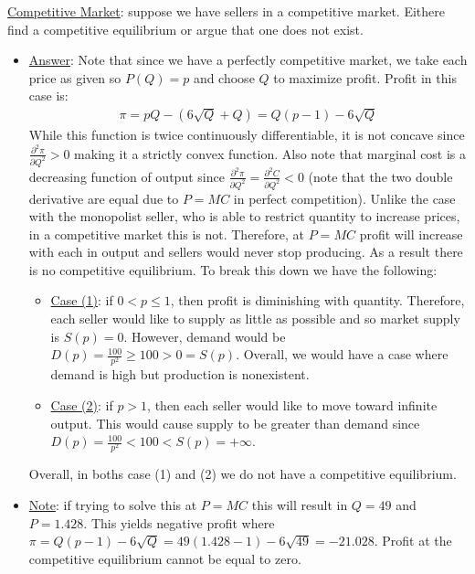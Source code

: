 \documentclass{article}
\begin{document}
  \par
  \underline{Competitive Market}: suppose we have sellers in a competitive market. Eithere find a competitive equilibrium or argue that one does not exist.
  \begin{itemize}
    \item  \underline{Answer}: Note that since we have a perfectly competitive market, we take each price as given so $P(Q) = p$ and choose $Q$ to maximize profit. Profit in this case is:
    \begin{gather*}
      \pi = pQ - (6\sqrt{Q} + Q) = Q(p-1) - 6\sqrt{Q}
    \end{gather*}
    While this function is twice continuously differentiable, it is not concave since $\tfrac{\partial^{2}\pi}{\partial Q^{2}} > 0$ making it a strictly convex function. Also note that marginal cost is a decreasing function of output since $\tfrac{\partial^{2}\pi}{\partial Q^{2}} = \tfrac{\partial^{2}C}{\partial Q^{2}} < 0$ (note that the two double derivative are equal due to $P=MC$ in perfect competition). Unlike the case with the monopolist seller, who is able to restrict quantity to increase prices, in a competitive market this is not. Therefore, at $P = MC$ profit will increase with each in output and sellers would never stop producing. As a result there is no competitive equilibrium. To break this down we have the following:
    \begin{itemize}
      \item  \underline{Case (1)}: if $0 < p \leq 1$, then profit is diminishing with quantity. Therefore, each seller would like to supply as little as possible and so market supply is $S(p) = 0$. However, demand would be $D(p) = \tfrac{100}{p^{2}} \geq 100 > 0 = S(p)$. Overall, we would have a case where demand is high but production is nonexistent.
      \item  \underline{Case (2)}: if $p > 1$, then each seller would like to move toward infinite output. This would cause supply to be greater than demand since $D(p) = \tfrac{100}{p^{2}} < 100 < S(p) = +\infty$.
    \end{itemize}
    Overall, in boths case (1) and (2) we do not have a competitive equilibrium.
    \item  \underline{Note}: if trying to solve this at $P=MC$ this will result in $Q=49$ and $P = 1.428$. This yields negative profit where $\pi = Q(p-1) - 6\sqrt{Q} = 49(1.428 - 1) - 6\sqrt{49} = -21.028$. Profit at the competitive equilibrium cannot be equal to zero.
  \end{itemize}
\end{document}
